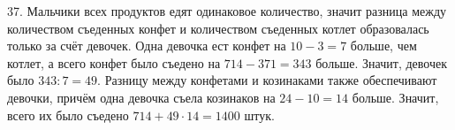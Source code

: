 37. Мальчики всех продуктов едят одинаковое количество, значит разница между количеством съеденных конфет и количеством съеденных котлет образовалась только за счёт девочек. Одна девочка ест конфет на $10-3=7$ больше, чем котлет, а всего конфет было съедено на $714-371=343$ больше. Значит, девочек было $343:7=49.$ Разницу между конфетами и козинаками также обеспечивают девочки, причём одна девочка съела козинаков на $24-10=14$ больше. Значит, всего их было съедено $714+49\cdot14=1400$ штук.\\
